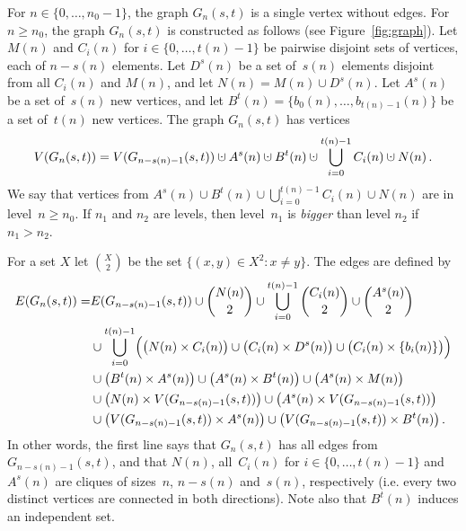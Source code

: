 \documentclass[authoryear]{article}
\makeatletter
\theoremstyle{definition}
\renewcommand{\mid}{\ensuremath{:}}
\newcommand{\0}{\emptyset}
\newcommand{\cupdot}{\mathbin{\mathaccent\cdot\cup}}
\newcommand{\ie}{i.e.\@\xspace}
\makeatother
\begin{document}
For $n \in\{0,\ldots,n_0-1\}$, the graph $G_n(s,t)$ is a single
vertex without edges. For $n\ge n_0$, the graph $G_n(s,t)$ is
constructed as follows (see Figure~\ref{fig:graph}).  Let $M(n)$ and $C_i(n)$ for
$i\in\{0,\ldots,t(n)-1\}$ be pairwise disjoint sets of vertices, each of
$n-s(n)$ elements. Let $D^s(n)$ be a set of~$s(n)$ elements disjoint from
all $C_i(n)$ and $M(n)$, and let $N(n) = M(n) \cup D^s(n)$. Let $A^s(n)$ be a set
of~$s(n)$ new vertices, and let $B^t(n) = \{b_0(n),\ldots,b_{t(n)-1}(n)\}$ be a
set of~$t(n)$ new vertices.  The graph $G_n(s,t)$ has vertices
\[V(G_n(s,t)) = V(G_{n-s(n)-1}(s,t)) \cupdot A^s(n) \cupdot B^t(n) \cupdot
\bigcup_{i = 0}^{t(n)-1} C_i(n)\cupdot N(n)\,.\]
 We say that vertices from $A^s(n) \cup B^t(n) \cup \bigcup_{i = 0}^{t(n)-1} C_i(n) \cup N(n)$
are in level~$n\ge n_0$. If $n_1$ and $n_2$ are levels, then level~$n_1$ is
\emph{bigger} than level $n_2$ if $n_1>n_2$.

For a set $X$ let $X \choose 2$ be the set
$\{(x,y)\in X^2 \mid x\neq y\}$. The edges are defined by
\begin{align*}
E(G_n(s,t)) = &E(G_{n-s(n)-1}(s,t)) \cup {N(n) \choose 2} \cup \bigcup_{i=0}^{t(n)-1}
{C_i(n) \choose 2} \cup {A^s(n) \choose 2}\\
                     &\cup \bigcup_{i=0}^{t(n)-1} \Bigl( \bigl(N(n) \times
                     C_i(n)\bigr) \cup \bigl(C_i(n) \times D^s(n)
                     \bigr) \cup \bigl(C_i(n) \times
                     \{b_i(n)\}\bigr) \Bigr)\\
                    & \cup
                     \bigl(B^t(n) \times A^s(n)\bigr) \cup
                     \bigl(A^s(n) \times B^t(n) \bigr)\cup \bigl(A^s(n) \times M(n)\bigr)\\
                    & \cup \bigl(N(n) \times V(G_{n-s(n)-1}(s,t))\bigr) \cup \bigl(A^s(n)
                     \times V(G_{n-s(n)-1}(s,t))\bigr)\\
                    & \cup \bigl( V(G_{n-s(n)-1}(s,t))
                     \times A^s(n) \bigr) \cup \bigl(V(G_{n-s(n)-1}(s,t)) \times B^t(n)\bigr)\,.
\end{align*}
In other words, the first line says that $G_n(s,t)$ has all edges from
$G_{n-s(n)-1}(s,t)$, and that $N(n)$, all~$C_i(n)$
for $i\in\{0,\ldots,t(n)-1\}$ and $A^s(n)$ are cliques of sizes~$n$, $n-s(n)$
and~$s(n)$, respectively (\ie every two distinct vertices are connected in both directions). Note also that $B^t(n)$ induces an independent set.
\end{document}
